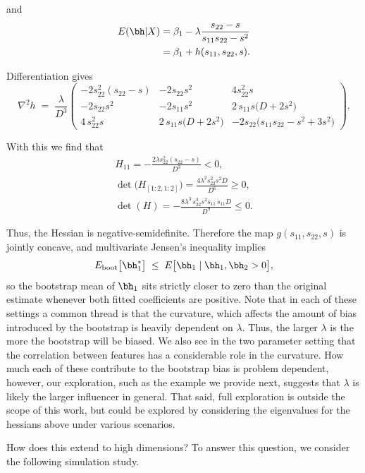 \noindent and
$$
\begin{aligned}
E(\bh|X) &= \beta_1 - \lambda\frac{s_{22} - s}{s_{11}s_{22} - s^2} \\
&= \beta_1 + h(s_{11}, s_{22}, s).
\end{aligned}
$$

\noindent Differentiation gives
$$
\nabla^{2}h \;=\; \frac{\lambda}{D^{3}}
\begin{pmatrix}
-2s_{22}^{2}(s_{22}-s) & -2s_{22}s^{2} & 4s_{22}^{2}s\\[6pt]
-2s_{22}s^{2} & -2s_{11}s^{2} & 2\,s_{11}s\bigl(D+2s^{2}\bigr)\\[6pt]
4\,s_{22}^{2}s & 2\,s_{11}s\bigl(D+2s^{2}\bigr) & -2s_{22}\bigl(s_{11}s_{22}-s^{2}+3s^{2}\bigr)
\end{pmatrix}.
$$

\noindent With this we find that
$$
\begin{aligned}
H_{11} = -\frac{2\lambda s_{22}^{2}(s_{22}-s)}{D^{3}} < 0, \\ 
\det\bigl(H_{[1:2,1:2]}\bigr) = \frac{4\lambda^{2}s_{22}^{2}s^{2}D}{D^{6}} \geq 0, \\
\det(H) = -\frac{8\lambda^{3}\,s_{22}^{3}s^{2}s_{11}\,s_{11}D}{D^{9}} \leq 0.
\end{aligned}
$$

\noindent Thus, the Hessian is negative-semidefinite.  Therefore the map $g(s_{11},s_{22},s)$ is jointly concave, and multivariate Jensen's inequality implies
$$
E_{\text{boot}}\bigl[\bh_{1}^{*}\bigr]
  \;\le\; E\bigl[\bh_{1}\mid \bh_1, \bh_2 > 0 \bigr],
$$
so the bootstrap mean of $\bh_{1}$ sits strictly closer to zero than the original estimate whenever both fitted coefficients are positive. Note that in each of these settings a common thread is that the curvature, which affects the amount of bias introduced by the bootstrap is heavily dependent on $\lambda$. Thus, the larger $\lambda$ is the more the bootstrap will be biased. We also see in the two parameter setting that the correlation between features has a considerable role in the curvature. How much each of these contribute to the bootstrap bias is problem dependent, however, our exploration, such as the example we provide next, suggests that $\lambda$ is likely the larger influencer in general. That said, full exploration is outside the scope of this work, but could be explored by considering the eigenvalues for the hessians above under various scenarios.

How does this extend to high dimensions? To answer this question, we consider the following simulation study.

